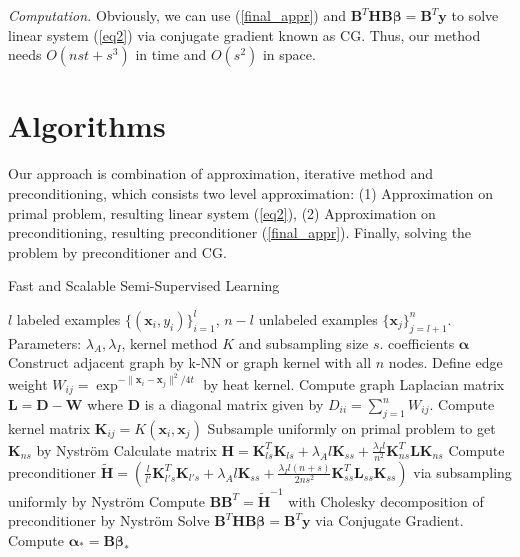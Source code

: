 \documentclass{article}
\begin{document}
\emph{Computation.} Obviously, we can use (\ref{final_appr}) and
$\mathbf{B}^T\mathbf{H}\mathbf{B}\boldsymbol{\beta}=\mathbf{B}^T\mathbf{y}$
to solve linear system (\ref{eq2}) via conjugate gradient \cite{saad2003iterative} known as CG.
Thus, our method needs $O(nst+s^3)$ in time and $O(s^2)$ in space.

\section{Algorithms}
Our approach is combination of approximation, iterative method and preconditioning,
which consists two level approximation:
(1) Approximation on primal problem, resulting linear system (\ref{eq2}),
(2) Approximation on preconditioning, resulting preconditioner (\ref{final_appr}).
Finally, solving the problem by preconditioner and CG.
\begin{algorithm}\label{alg}
\caption{Fast and Scalable Semi-Supervised Learning}
\begin{algorithmic}[1]
\REQUIRE $l$ labeled examples $\{(\mathbf{x}_i, y_i)\}_{i=1}^l$, $n-l$ unlabeled examples $\{\mathbf{x}_j\}_{j=l+1}^n$.
Parameters: $\lambda_A, \lambda_I$, kernel method $K$ and subsampling size $s$.
\ENSURE coefficients $\boldsymbol{\alpha}$
\STATE Construct adjacent graph by k-NN or graph kernel with all $n$ nodes.
\STATE Define edge weight $W_{ij}=\exp ^{-\|\mathbf{x}_i-\mathbf{x}_j\|^2/4t}$ by heat kernel.
\STATE Compute graph Laplacian matrix $\mathbf{L}=\mathbf{D}-\mathbf{W}$
where $\mathbf{D}$ is a diagonal matrix given by $D_{ii}=\sum_{j=1}^n W_{ij}$.
\STATE Compute kernel matrix $\mathbf{K}_{ij}=K(\mathbf{x}_i, \mathbf{x}_j)$
\STATE Subsample uniformly on primal problem to get $\mathbf{K}_{ns}$ by Nystr\"om
\STATE Calculate matrix $
\mathbf{H}=\mathbf{K}_{ls}^T\mathbf{K}_{ls}
+\lambda_A l \mathbf{K}_{ss}
+\frac{\lambda_I l}{n^2}\mathbf{K}_{ns}^T\mathbf{L}\mathbf{K}_{ns}$
\STATE Compute preconditioner $\tilde{\mathbf{H}}=
(\frac{l}{l'}\mathbf{K}_{l's}^T\mathbf{K}_{l's}
+\lambda_A l \mathbf{K}_{ss}
+\frac{\lambda_I l(n+s)}{2ns^2}\mathbf{K}_{ss}^T\mathbf{L}_{ss}\mathbf{K}_{ss})$ 
via subsampling uniformly by Nystr\"om
\STATE Compute $\mathbf{B}\mathbf{B}^T=\tilde{\mathbf{H}}^{-1}$ with Cholesky decomposition of preconditioner by Nystr\"om
\STATE Solve $\mathbf{B}^T\mathbf{H}\mathbf{B}\boldsymbol{\beta}=\mathbf{B}^T\mathbf{y}$ via Conjugate Gradient.
\STATE Compute $\boldsymbol{\alpha}_\ast=\mathbf{B}\boldsymbol{\beta}_\ast$
\end{algorithmic}
\end{algorithm}
\end{document}
